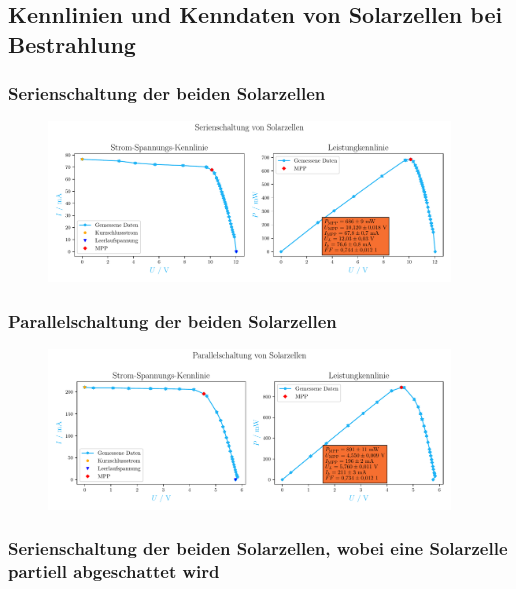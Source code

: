 \documentclass[12pt,english,ngerman]{scrartcl}
\begin{document}
\subsection{Kennlinien und Kenndaten von Solarzellen bei Bestrahlung}


\subsubsection{Serienschaltung der beiden Solarzellen}
\begin{figure}[H]
	\centering
	\includegraphics[width=0.95\textwidth]{figures/serienschaltung.pdf}
	\caption{}\label{fig:auws_kennlinie_serie}
\end{figure}

\subsubsection{Parallelschaltung der beiden Solarzellen}
\begin{figure}[H]
	\centering
	\includegraphics[width=0.95\textwidth]{figures/parallelschaltung.pdf}
	\caption{}\label{fig:auws_kennlinie_parallel}
\end{figure}

\subsubsection{Serienschaltung der beiden Solarzellen, wobei eine Solarzelle partiell abgeschattet wird}
\end{document}
